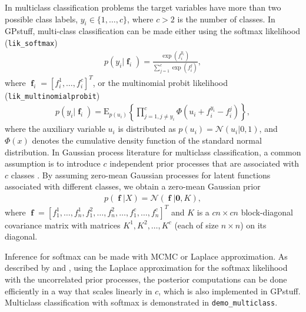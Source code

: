 \documentclass[twoside,11pt]{article}
\DeclareMathOperator{\f}{\mathbf{f}}
\newcommand{\pkg}[1]{{\fontseries{b}\selectfont #1}}
\newcommand{\code}[1]{{\normalfont\texttt{#1}}}
\begin{document}
In multiclass classification problems the target variables have more
than two possible class labels, $y_i\in\{1,\ldots,c\}$, where $c>2$ is
the number of classes. In \pkg{GPstuff}, multi-class classification
can be made either using the softmax likelihood (\code{lik\_softmax})
%
\begin{eqnarray}
p(y_i|\f_i)=\frac{\exp(f_i^{y_i})}{\sum_{j=1}^c\exp(f_i^{j})},
\end{eqnarray}
where $\f_i=\left[f_i^1,\ldots,f_i^c\right]^T$, or the multinomial
probit likelihood  (\code{lik\_multinomialprobit})
\begin{eqnarray}
p(y_i|\f_i)=\mathrm{E}_{p(u_i)} \left\{\prod_{j=1,j\neq y_i}^c \Phi (u_i+f^{y_i}_i-f^j_i)
\right\},
\end{eqnarray}
where the auxiliary variable $u_i$ is distributed as
$p(u_i)=\mathcal{N}(u_i|0,1)$, and $\Phi(x)$ denotes the cumulative
density function of the standard normal distribution.
%
In Gaussian process literature for multiclass classification, a common
assumption is to introduce $c$ independent prior processes that are
associated with $c$ classes \citep[see, e.g.,][]{Rasmussen+Williams:2006}.
%
By assuming zero-mean Gaussian processes for latent functions
associated with different classes, we obtain a zero-mean Gaussian
prior
\begin{eqnarray}
  p(\f|X)=\mathcal{N}(\f|\mathbf{0}, K),
\end{eqnarray}
where
$\f=\left[f_1^1,\ldots,f_n^1,f_1^2,\ldots,f_n^2,\ldots,f_1^c,\ldots,f_n^c\right]^T$
and $K$ is a $cn \times cn$ block-diagonal covariance matrix with
matrices $K^1, K^2,\ldots,K^c$ (each of size $n \times n$) on its
diagonal.

Inference for softmax can be made with MCMC or Laplace approximation.
As described by \citet{Williams+Barber:1998} and
\citet{Rasmussen+Williams:2006}, using the Laplace approximation for
the softmax likelihood with the uncorrelated prior processes, the
posterior computations can be done efficiently in a way that scales
linearly in $c$, which is also implemented in
\pkg{GPstuff}. Multiclass classification with softmax is demonstrated
in \code{demo\_multiclass}.
\end{document}
